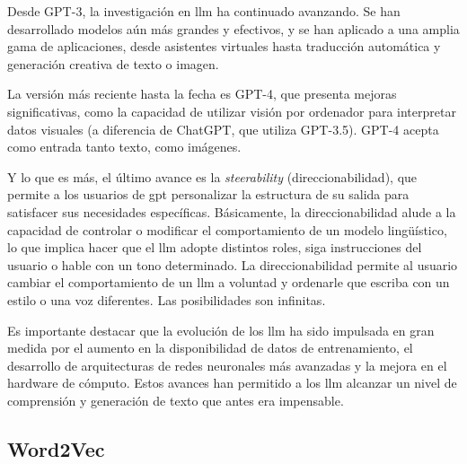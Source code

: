 \begin{description}
Desde GPT-3, la investigación en \acrshort{llm} ha continuado avanzando. Se han desarrollado modelos aún más grandes y efectivos, y se han aplicado a una amplia gama de aplicaciones, desde asistentes virtuales hasta traducción automática y generación creativa de texto o imagen.

La versión más reciente hasta la fecha es GPT-4, que presenta mejoras significativas, como la capacidad de utilizar visión por ordenador para interpretar datos visuales (a diferencia de ChatGPT, que utiliza GPT-3.5). GPT-4 acepta como entrada tanto texto, como imágenes. 

Y lo que es más, el último avance es la \textit{steerability} (direccionabilidad), que permite a los usuarios de \acrshort{gpt} personalizar la estructura de su salida para satisfacer sus necesidades específicas. Básicamente, la direccionabilidad alude a la capacidad de controlar o modificar el comportamiento de un modelo lingüístico, lo que implica hacer que el \acrshort{llm} adopte distintos roles, siga instrucciones del usuario o hable con un tono determinado. La direccionabilidad permite al usuario cambiar el comportamiento de un \acrshort{llm} a voluntad y ordenarle que escriba con un estilo o una voz diferentes. Las posibilidades son infinitas.

\end{description}


Es importante destacar que la evolución de los \acrshort{llm} ha sido impulsada en gran medida por el aumento en la disponibilidad de datos de entrenamiento, el desarrollo de arquitecturas de redes neuronales más avanzadas y la mejora en el hardware de cómputo. Estos avances han permitido a los \acrshort{llm} alcanzar un nivel de comprensión y generación de texto que antes era impensable.

\subsection{Word2Vec}

